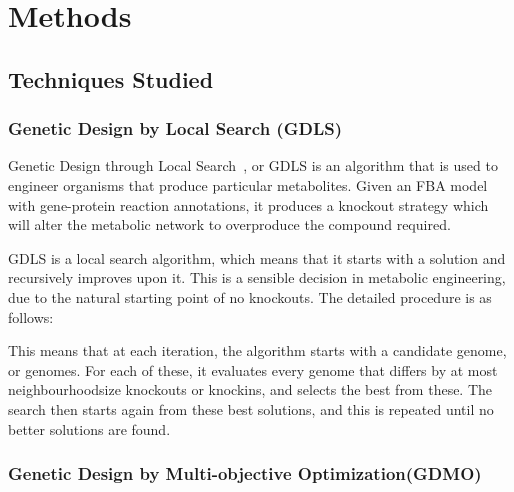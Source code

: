 \chapter{Methods}

\section{Techniques Studied}

\subsection{Genetic Design by Local Search (GDLS)}
Genetic Design through Local Search~\cite{Lun2009}, or GDLS is an algorithm that is used to engineer organisms that produce particular metabolites. 
Given an FBA model with gene-protein reaction annotations, it produces a knockout strategy which will alter the metabolic network to overproduce the compound required.

GDLS is a local search algorithm, which means that it starts with a solution and recursively improves upon it. 
This is a sensible decision in metabolic engineering, due to the natural starting point of no knockouts. 
The detailed procedure is as follows:


This means that at each iteration, the algorithm starts with a candidate genome, or genomes. For each of these, it evaluates every genome that differs by at most neighbourhoodsize knockouts or knockins, and selects the best from these. The search then starts again from these best solutions, and this is repeated until no better solutions are found. 

\subsection{Genetic Design by Multi-objective Optimization(GDMO)} 


